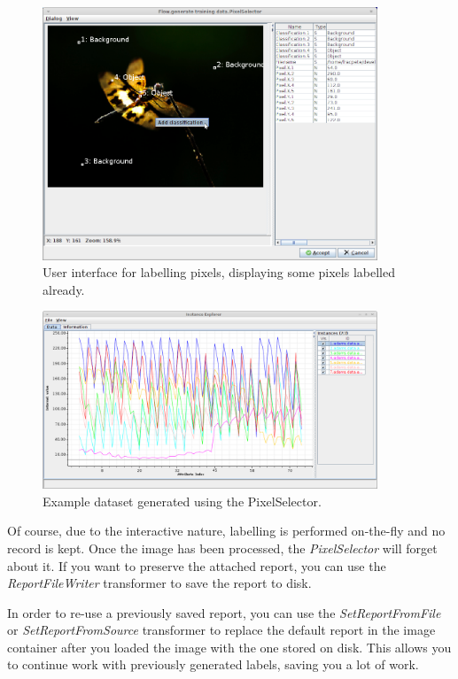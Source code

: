 \documentclass[a4paper]{book}
\begin{document}
\begin{figure}[htb]
  \centering
  \includegraphics[width=10.0cm]{images/pixelselector-interaction.png}
  \caption{User interface for labelling pixels, displaying some pixels
  labelled already.}
  \label{pixelselector-interaction}
\end{figure}

\begin{figure}[htb]
  \centering
  \includegraphics[width=10.0cm]{images/pixelselector-dataset.png}
  \caption{Example dataset generated using the PixelSelector.}
  \label{pixelselector-dataset}
\end{figure}

Of course, due to the interactive nature, labelling is performed on-the-fly and
no record is kept. Once the image has been processed, the
\textit{PixelSelector} will forget about it. If you want to preserve the
attached report, you can use the \textit{ReportFileWriter} transformer to save
the report to disk. 

In order to re-use a previously saved report, you can use the
\textit{SetReportFromFile} or \textit{SetReportFromSource} transformer to
replace the default report in the image container after you loaded the image
with the one stored on disk. This allows you to continue work with previously
generated labels, saving you a lot of work.
\end{document}
